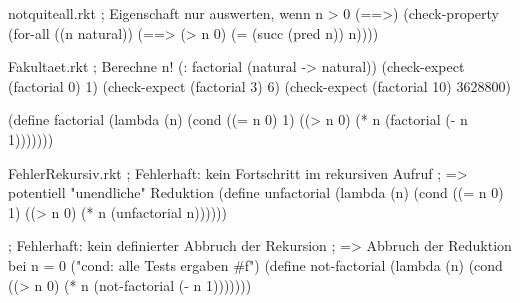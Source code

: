 \begin{filecontents*}{notquiteall.rkt}
; Eigenschaft nur auswerten, wenn n > 0 (==>)
(check-property
 (for-all ((n natural))
   (==> (> n 0)   
        (= (succ (pred n)) n))))
\end{filecontents*}
\begin{filecontents*}{Fakultaet.rkt}
; Berechne n!
(: factorial (natural -> natural))
(check-expect (factorial 0) 1)
(check-expect (factorial 3) 6)
(check-expect (factorial 10) 3628800)

(define factorial
  (lambda (n)
    (cond ((= n 0) 1)
          ((> n 0) (* n (factorial (- n 1)))))))
\end{filecontents*}
\begin{filecontents*}{FehlerRekursiv.rkt}
; Fehlerhaft: kein Fortschritt im rekursiven Aufruf
; => potentiell "unendliche" Reduktion
(define unfactorial
  (lambda (n)
    (cond ((= n 0) 1)
          ((> n 0) (* n (unfactorial n))))))

; Fehlerhaft: kein definierter Abbruch der Rekursion
; => Abbruch der Reduktion bei n = 0 ("cond: alle Tests ergaben #f")
(define not-factorial
  (lambda (n)
    (cond ((> n 0) (* n (not-factorial (- n 1)))))))
\end{filecontents*}